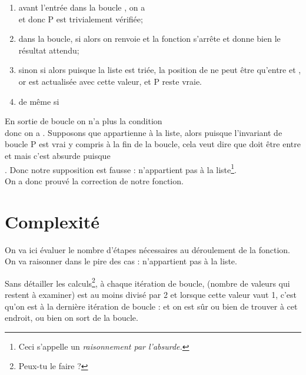 \begin{enumerate}[--]
    \item   avant l'entrée dans la boucle , on a\\
      et  donc P est trivialement vérifiée;
    \item   dans la boucle, si   alors on renvoie  et la fonction s'arrête et donne bien le résultat attendu;
    \item   sinon si  alors puisque la liste est triée, la position de  ne peut être qu'entre  et , or  est actualisée avec cette valeur, et P reste vraie.
    \item   de même si 
\end{enumerate}
En sortie de boucle on n'a plus la condition \\
 donc on a . Supposons que  appartienne à la liste, alors puisque l'invariant de boucle P est vrai y compris à la fin de la boucle, cela veut dire que  doit être entre  et  mais c'est absurde puisque\\  . Donc notre supposition est fausse :  n'appartient pas à la liste\footnote{Ceci s'appelle un \textit{raisonnement par l'absurde.}}.\\

On a donc prouvé la correction de notre fonction.

\section{Complexité}

On va ici évaluer le nombre d'étapes nécessaires au déroulement de la fonction. On va raisonner dans le pire des cas :  n'appartient pas à la liste.

Sans détailler les calculs\footnote{Peux-tu le faire ?}, à chaque itération de boucle,  (nombre de valeurs qui restent à examiner) est au moins divisé par 2 et lorsque  cette valeur vaut 1, c'est qu'on est à la dernière itération de boucle :  et on est sûr ou bien de trouver  à cet endroit, ou bien on sort de la boucle.\\

